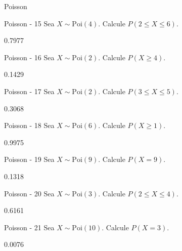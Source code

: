 \documentclass[a4,11pt]{aleph-notas}
\newcommand{\Poi}{\text{Poi}}
\begin{document}
\begin{quiz}{Poisson}
\begin{numerical}[tolerance=0.001]%
    {Poisson - 15}
    Sea \( X \sim \Poi(4) \). Calcule \( P(2 \leq X \leq 6) \).
    \item[] 0.7977
\end{numerical}

\begin{numerical}[tolerance=0.001]%
    {Poisson - 16}
    Sea \( X \sim \Poi(2) \). Calcule \( P(X \geq 4) \).
    \item[] 0.1429
\end{numerical}

\begin{numerical}[tolerance=0.001]%
    {Poisson - 17}
    Sea \( X \sim \Poi(2) \). Calcule \( P(3 \leq X \leq 5) \).
    \item[] 0.3068
\end{numerical}

\begin{numerical}[tolerance=0.001]%
    {Poisson - 18}
    Sea \( X \sim \Poi(6) \). Calcule \( P(X \geq 1) \).
    \item[] 0.9975
\end{numerical}

\begin{numerical}[tolerance=0.001]%
    {Poisson - 19}
    Sea \( X \sim \Poi(9) \). Calcule \( P(X = 9) \).
    \item[] 0.1318
\end{numerical}

\begin{numerical}[tolerance=0.001]%
    {Poisson - 20}
    Sea \( X \sim \Poi(3) \). Calcule \( P(2 \leq X \leq 4) \).
    \item[] 0.6161
\end{numerical}

\begin{numerical}[tolerance=0.001]%
    {Poisson - 21}
    Sea \( X \sim \Poi(10) \). Calcule \( P(X = 3) \).
    \item[] 0.0076
\end{numerical}


\end{quiz}
\end{document}
